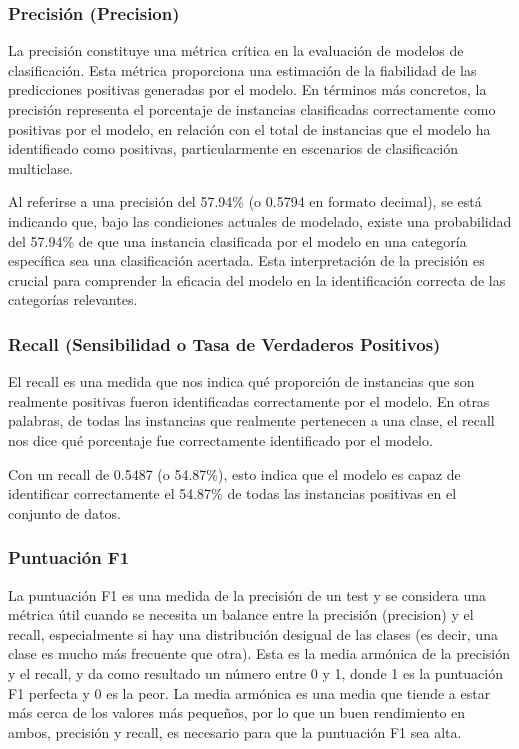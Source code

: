 \subsubsection{Precisión (Precision)}
La precisión constituye una métrica crítica en la evaluación de modelos de clasificación. Esta métrica proporciona una estimación de la fiabilidad de las predicciones positivas generadas por el modelo. En términos más concretos, la precisión representa el porcentaje de instancias clasificadas correctamente como positivas por el modelo, en relación con el total de instancias que el modelo ha identificado como positivas, particularmente en escenarios de clasificación multiclase.

Al referirse a una precisión del 57.94\% (o 0.5794 en formato decimal), se está indicando que, bajo las condiciones actuales de modelado, existe una probabilidad del 57.94\% de que una instancia clasificada por el modelo en una categoría específica sea una clasificación acertada. Esta interpretación de la precisión es crucial para comprender la eficacia del modelo en la identificación correcta de las categorías relevantes.

\subsubsection{Recall (Sensibilidad o Tasa de Verdaderos Positivos)}
El recall es una medida que nos indica qué proporción de instancias que son realmente positivas fueron identificadas correctamente por el modelo. En otras palabras, de todas las instancias que realmente pertenecen a una clase, el recall nos dice qué porcentaje fue correctamente identificado por el modelo.

Con un recall de 0.5487 (o 54.87\%), esto indica que el modelo es capaz de identificar correctamente el 54.87\% de todas las instancias positivas en el conjunto de datos.

\subsubsection{Puntuación F1}

La puntuación F1 es una medida de la precisión de un test y se considera una métrica útil cuando se necesita un balance entre la precisión (precision) y el recall, especialmente si hay una distribución desigual de las clases (es decir, una clase es mucho más frecuente que otra).
Esta es la media armónica de la precisión y el recall, y da como resultado un número entre 0 y 1, donde 1 es la puntuación F1 perfecta y 0 es la peor. La media armónica es una media que tiende a estar más cerca de los valores más pequeños, por lo que un buen rendimiento en ambos, precisión y recall, es necesario para que la puntuación F1 sea alta.

